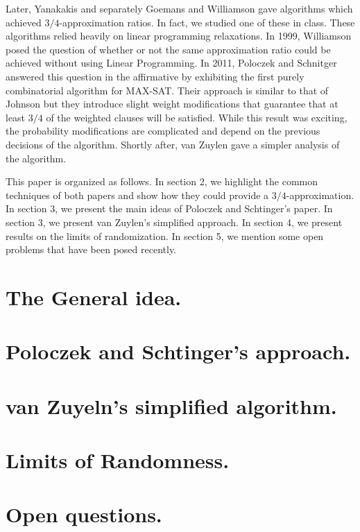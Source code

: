 \documentclass[11pt,letter]{article}
\begin{document}
Later, Yanakakis \cite{Yannakakis1994475} and separately Goemans and Williamson \cite{Goemans94new3/4-approximation} 
gave algorithms which achieved $3/4$-approximation ratios. In fact, we studied one of these in class. 
These algorithms relied heavily on linear programming relaxations. In 1999, Williamson posed the question 
of whether or not the same approximation ratio could be achieved without using Linear Programming. In 2011, 
Poloczek and Schnitger \cite{Poloczek:2011:RVJ:2133036.2133087} answered this question in the affirmative 
by exhibiting the first purely combinatorial algorithm for MAX-SAT. Their approach is similar to that of Johnson 
but they introduce slight weight modifications that guarantee that at least $3/4$ of the weighted clauses will be satisfied.
 While this result was exciting, the probability modifications are complicated and depend on the previous decisions
  of the algorithm. Shortly after, van Zuylen \cite{vanZuylen:2011:SAM:2238496.2238512} gave a simpler analysis of the algorithm. 

This paper is organized as follows. In section 2, we highlight the common techniques of both papers 
and show how they could provide a $3/4$-approximation. In section 3, we present the main ideas 
of Poloczek and Schtinger's paper. In section 3, we present van Zuylen's simplified approach. 
In section 4, we present results on the limits of randomization. 
In section 5, we mention some open problems that have been posed recently.

\section{The General idea.} 

\section{Poloczek and Schtinger's approach.}
\section{van Zuyeln's simplified algorithm.}
\section{Limits of Randomness.}
\section{Open questions.}
 
 

\end{document}
